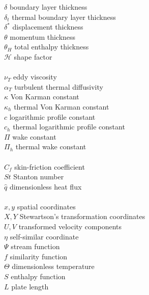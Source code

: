 \documentclass[a4paper,12pt]{book}
\begin{document}
\begin{multicols}{2}
\begin{tabbing}
 $\delta$ \> boundary layer thickness   \\
 $\delta_t$ \> thermal boundary layer thickness   \\
 $\delta^*$ \> displacement thickness   \\
 $\theta$ \> momentum thickness   \\
 $\theta_H$ \> total enthalpy thickness   \\
 $\mathcal{H}$ \> shape factor\\
 $ $ \>     \\

 $\nu_T$ \> eddy viscosity\\
 $\alpha_T$ \> turbulent thermal diffusivity\\
 $\kappa$ \> Von Karman constant\\
 $\kappa_h$ \> thermal Von Karman constant\\
 $c$ \> logarithmic profile constant    \\
 $c_h$ \> thermal logarithmic profile constant    \\
 $\Pi$ \> wake constant\\
 $\Pi_h$ \> thermal wake constant\\
 $ $ \>  \\

 $C_f$ \> skin-friction coefficient\\
 $St$ \> Stanton number\\
 $\hat{q}$ \> dimensionless heat flux\\
 $ $ \>     \\

 $x,y $\>  spatial coordinates  \\
 $X,Y $\>  Stewartson's transformation coordinates  \\
 $U,V $\>  transformed velocity components  \\
 $\eta$\> self-similar coordinate\\
 $\Psi$ \> stream function \\
 $f$ \> similarity function \\
 $\Theta$ \> dimensionless temperature \\
 $S$ \> enthalpy function \\
 $L$ \> plate length\\
 $ $ \>  \\


\end{tabbing}
\end{multicols}
\end{document}
